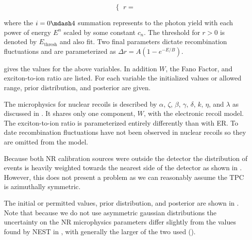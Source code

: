 \begin{equation}
\begin{cases}
r =
\end{cases}
\end{equation}

\noindent where the $i = 0 \mdash 4$ summation represents to the photon yield with each power of energy $E^n$ scaled by some constant
$c_n$.  The threshold for $r > 0$ is denoted by $E_{\mathrm{thresh}}$ and also fit.  Two final parameters dictate recombination
fluctuations and are parameterized as $\Delta r = A (1 - e^{-E / B})$.

 gives the values for the above variables.  In addition $W$, the Fano Factor, and exciton-to-ion
ratio are listed.  For each variable the initialized values or allowed range, prior distribution, and posterior are given.

The microphysics for nuclear recoils is described by $\alpha$, $\zeta$, $\beta$, $\gamma$, $\delta$, $k$, $\eta$, and $\lambda$ as
discussed in .  It shares only one
component, $W$, with the electronic recoil model.  The exciton-to-ion ratio is parameterized entirely differently than with ER.  To date
recombination fluctuations have not been observed in nuclear recoils so they are omitted from the model.

Because both NR calibration sources were outside the detector the distribution of events is heavily weighted towards the nearest side of
the detector as shown in .  However, this does not present a problem as
we can reasonably assume the TPC is azimuthally symmetric.

The initial or permitted values, prior distribution, and posterior are shown in .  Note that
because we do not use asymmetric gaussian distributions the uncertainty on the NR microphysics parameters differ slightly from the values
found by NEST in , with generally the larger of the two used
().


